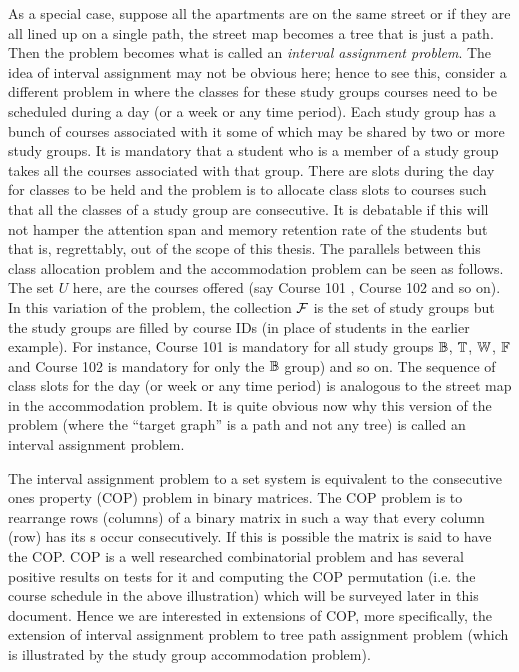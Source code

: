 \documentclass[MS,synopsis]{iitmdiss}
\begin{document}
As a special case, suppose all the apartments are on the same street
or if they are all lined up on a single path, the street map becomes a
tree that is just a path. Then the problem becomes what is called an
{\em interval assignment problem}. The idea of interval assignment may
not be obvious here; hence to see this, consider a different problem
in {\WSI} where the classes for these study groups courses need to be
scheduled during a day (or a week or any time period). Each study
group has a bunch of courses associated with it some of which may be
shared by two or more study groups. It is mandatory that a student who
is a member of a study group takes all the courses associated with
that group. There are slots during the day for classes to be held and
the problem is to allocate class slots to courses such that all the
classes of a study group are consecutive. It is debatable if this will
not hamper the attention span and memory retention rate of the
students but that is, regrettably, out of the scope of this
thesis. The parallels between this class allocation problem and the
accommodation problem can be seen as follows. The set $U$ here, are
the courses offered (say Course 101 {\coneohone}, Course 102
{\coneohtwo} and so on). In this variation of the problem, the
collection ${\cal F}$ is the set of study groups but the study groups are
filled by course IDs (in place of students in the earlier
example). For instance, Course 101 is mandatory for all study groups
$\mathbb{B}$, $\mathbb{T}$, $\mathbb{W}$, $\mathbb{F}$ and Course 102 is mandatory for
only the $\mathbb{B}$ group) and so on. The sequence of class slots for the
day (or week or any time period) is analogous to the street map in the
accommodation problem. It is quite obvious now why this version of the
problem (where the ``target graph'' is a path and not any
tree) is called an interval assignment
problem.

The interval assignment problem to a set system is equivalent to the
consecutive ones property (COP) problem in binary matrices\cite{wlh02,
  nsnrs09}.  The COP problem is to rearrange rows (columns) of a
binary matrix in such a way that every column (row) has its {\un}s
occur consecutively. If this is possible the matrix is said to have
the COP.  COP is a well researched combinatorial problem and has
several positive results on tests for it and computing the COP
permutation (i.e. the course schedule in the above illustration) which
will be surveyed later in this document. Hence we are interested in
extensions of COP, more specifically, the extension of interval
assignment problem to tree path assignment problem (which is
illustrated by the study group accommodation problem).
\end{document}
